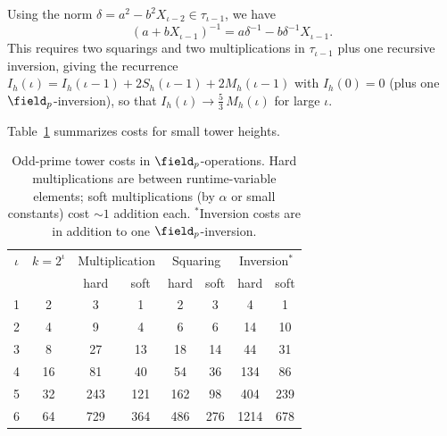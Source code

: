 Using the norm $\delta = a^2 - b^2 X_{\iota-2} \in \tau_{\iota-1}$, we have
\[
(a+bX_{\iota-1})^{-1} = a\delta^{-1} - b\delta^{-1} X_{\iota-1}.
\]
This requires two squarings and two multiplications in $\tau_{\iota-1}$ plus one recursive inversion, giving the recurrence $I_h(\iota) = I_h(\iota-1) + 2S_h(\iota-1) + 2M_h(\iota-1)$ with $I_h(0) = 0$ (plus one $\field_p$-inversion), so that $I_h(\iota) \to \frac{5}{3}\,M_h(\iota)$ for large $\iota$.

Table~\ref{tab:tower-costs} summarizes costs for small tower heights.

\begin{table}[ht]
\centering
\begin{tabular}{c|c|cc|cc|cc}
\toprule
$\iota$ & $k=2^\iota$ & \multicolumn{2}{c|}{Multiplication} & \multicolumn{2}{c|}{Squaring} & \multicolumn{2}{c}{Inversion${}^*$} \\
 & & hard & soft & hard & soft & hard & soft \\
\midrule
1 & 2   &    3 &   1 &    2 &   3 &     4 &    1 \\
2 & 4   &    9 &   4 &    6 &   6 &    14 &   10 \\
3 & 8   &   27 &  13 &   18 &  14 &    44 &   31 \\
4 & 16  &   81 &  40 &   54 &  36 &   134 &   86 \\
5 & 32  &  243 & 121 &  162 &  98 &   404 &  239 \\
6 & 64  &  729 & 364 &  486 & 276 &  1214 &  678 \\
\bottomrule
\end{tabular}
\caption{Odd-prime tower costs in $\field_p$-operations. Hard multiplications are between runtime-variable elements; soft multiplications (by $\alpha$ or small constants) cost $\sim\!1$ addition each. ${}^*$Inversion costs are in addition to one $\field_p$-inversion.}
\label{tab:tower-costs}
\end{table}

